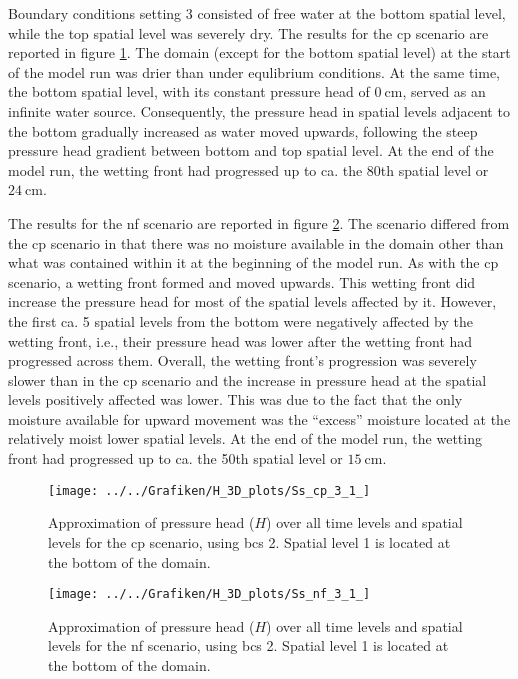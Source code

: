 Boundary conditions setting 3 consisted of free water at the bottom spatial level, while the top spatial level was severely dry.  The results for the cp scenario are reported in figure \ref{fig:cp3}.  The domain (except for the bottom spatial level) at the start of the model run was drier than under equlibrium conditions.  At the same time, the bottom spatial level, with its constant pressure head of $\SI{0}{\centi\meter}$, served as an infinite water source.  Consequently, the pressure head in spatial levels adjacent to the bottom gradually increased as water moved upwards, following the steep pressure head gradient between bottom and top spatial level.  At the end of the model run, the wetting front had progressed up to ca. the 80th spatial level or $\SI{24}{\centi\meter}$.

The results for the nf scenario are reported in figure \ref{fig:nf3}.  The scenario differed from the cp scenario in that there was no moisture available in the domain other than what was contained within it at the beginning of the model run.  As with the cp scenario, a wetting front formed and moved upwards.  This wetting front did increase the pressure head for most of the spatial levels affected by it.  However, the first ca. 5 spatial levels from the bottom were negatively affected by the wetting front, i.e., their pressure head was lower after the wetting front had progressed across them.  Overall, the wetting front’s progression was severely slower than in the cp scenario and the increase in pressure head at the spatial levels positively affected was lower.  This was due to the fact that the only moisture available for upward movement was the ``excess'' moisture located at the relatively moist lower spatial levels.  At the end of the model run, the wetting front had progressed up to ca. the 50th spatial level or $\SI{15}{\centi\meter}$.

\begin{figure}[H]
  \centering
  \texttt{[image: ../../Grafiken/H\_3D\_plots/Ss\_cp\_3\_1\_]}
  \caption{Approximation of pressure head ($H$) over all time levels and spatial levels for the cp scenario, using bcs 2.  Spatial level 1 is located at the bottom of the domain.}
  \label{fig:cp3}
\end{figure}

\begin{figure}[H]
  \centering
  \texttt{[image: ../../Grafiken/H\_3D\_plots/Ss\_nf\_3\_1\_]}
  \caption{Approximation of pressure head ($H$) over all time levels and spatial levels for the nf scenario, using bcs 2.  Spatial level 1 is located at the bottom of the domain.}
  \label{fig:nf3}
\end{figure}

